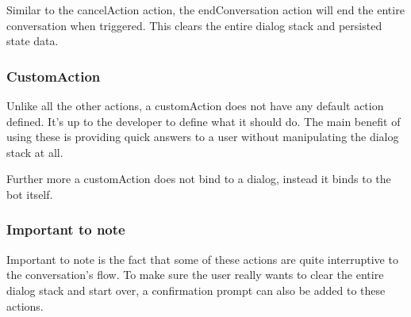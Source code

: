 Similar to the cancelAction action, the endConversation action will end the entire conversation when triggered. This clears the entire dialog stack and persisted state data.

\subsubsection{CustomAction}

Unlike all the other actions, a customAction does not have any default action defined. It's up to the developer to define what it should do. The main benefit of using these is providing quick answers to a user without manipulating the dialog stack at all.

Further more a customAction does not bind to a dialog, instead it binds to the bot itself.

\subsubsection{Important to note}

Important to note is the fact that some of these actions are quite interruptive to the conversation's flow. To make sure the user really wants to clear the entire dialog stack and start over, a confirmation prompt can also be added to these actions.